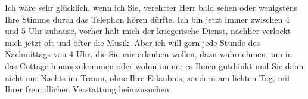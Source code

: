 \pstart
           Ich wäre sehr glücklich, wenn ich Sie, verehrter Herr \label{T_L03683-1v}\label{T_L03683-1} bald sehen oder wenigstens Ihre
               Stimme durch das Telephon hören dürfte. Ich bin jetzt {\pb}immer zwischen 4 und 5 Uhr zuhause, vorher
               hält mich der kriegerische Dienst, nachher verlockt mich jetzt oft und öfter die
               Musik. Aber ich will gern jede Stunde des Nachmittags von 4 Uhr, die Sie mir erlauben
               wollen, dazu wahrnehmen, um in das Cottage
               hinauszukommen oder wohin immer es Ihnen gutdünkt und Sie dann nicht nur Nachts im Traum, ohne Ihre Erlaubnis, sondern am
               lichten Tag, mit Ihrer freundlichen Verstattung heim\introOben{}zu\introOben{}suchen\pend
           
